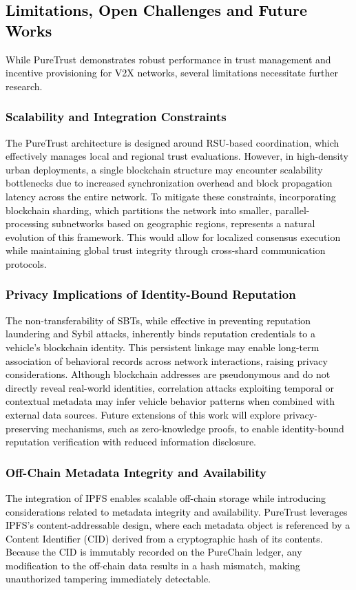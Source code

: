 \cite{cho2010survey}\documentclass[journal,comsoc,twoside]{IEEEtran}
\begin{document}
\textcolor{black}{
\subsection{Limitations, Open Challenges and Future Works}
\label{limitations}
While PureTrust demonstrates robust performance in trust management and incentive provisioning for V2X networks, several limitations necessitate further research.}

\textcolor{black}{
\subsubsection{Scalability and Integration Constraints}
The PureTrust architecture is designed around RSU-based coordination, which effectively manages local and regional trust evaluations. However, in high-density urban deployments, a single blockchain structure may encounter scalability bottlenecks due to increased synchronization overhead and block propagation latency across the entire network. To mitigate these constraints, incorporating blockchain sharding, which partitions the network into smaller, parallel-processing subnetworks based on geographic regions, represents a natural evolution of this framework. This would allow for localized consensus execution while maintaining global trust integrity through cross-shard communication protocols.}

\textcolor{black}{
\subsubsection{Privacy Implications of Identity-Bound Reputation}
The non-transferability of SBTs, while effective in preventing reputation laundering and Sybil attacks, inherently binds reputation credentials to a vehicle’s blockchain identity. This persistent linkage may enable long-term association of behavioral records across network interactions, raising privacy considerations. Although blockchain addresses are pseudonymous and do not directly reveal real-world identities, correlation attacks exploiting temporal or contextual metadata may infer vehicle behavior patterns when combined with external data sources. Future extensions of this work will explore privacy-preserving mechanisms, such as zero-knowledge proofs, to enable identity-bound reputation verification with reduced information disclosure.
}

\textcolor{black}{
\subsubsection{Off-Chain Metadata Integrity and Availability}
The integration of IPFS enables scalable off-chain storage while introducing considerations related to metadata integrity and availability. PureTrust leverages IPFS’s content-addressable design, where each metadata object is referenced by a Content Identifier (CID) derived from a cryptographic hash of its contents. Because the CID is immutably recorded on the PureChain ledger, any modification to the off-chain data results in a hash mismatch, making unauthorized tampering immediately detectable.}
\end{document}
